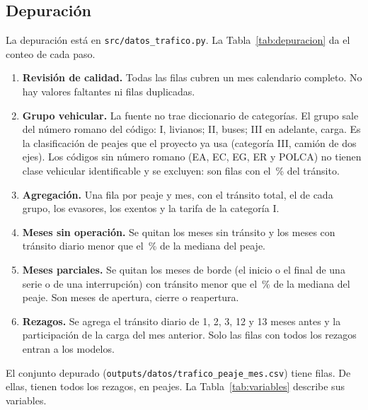\documentclass[12pt,a4paper]{article}
\begin{document}
\subsection{Depuración}

La depuración está en \texttt{src/datos\_trafico.py}. La
Tabla~\ref{tab:depuracion} da el conteo de cada paso.

\begin{enumerate}
\item \textbf{Revisión de calidad.} Todas las filas cubren un mes calendario
completo. No hay valores faltantes ni filas duplicadas.
\item \textbf{Grupo vehicular.} La fuente no trae diccionario de categorías.
El grupo sale del número romano del código: I, livianos; II, buses; III en
adelante, carga. Es la clasificación de peajes que el proyecto ya usa
(categoría III, camión de dos ejes). Los códigos sin número romano (EA, EC,
EG, ER y POLCA) no tienen clase vehicular identificable y se excluyen: son
\ctFilasSinClase{} filas con el \ctTransitoSinClase\,\% del tránsito.
\item \textbf{Agregación.} Una fila por peaje y mes, con el tránsito total,
el de cada grupo, los evasores, los exentos y la tarifa de la categoría I.
\item \textbf{Meses sin operación.} Se quitan los meses sin tránsito y los
meses con tránsito diario menor que el \ctUmbralAnomalo\,\% de la mediana del
peaje.
\item \textbf{Meses parciales.} Se quitan los meses de borde (el inicio o el
final de una serie o de una interrupción) con tránsito menor que el
\ctUmbralParcial\,\% de la mediana del peaje. Son meses de apertura, cierre o
reapertura.
\item \textbf{Rezagos.} Se agrega el tránsito diario de 1, 2, 3, 12 y 13
meses antes y la participación de la carga del mes anterior. Solo las filas
con todos los rezagos entran a los modelos.
\end{enumerate}

\begin{table}[H]
\centering
\caption{Filas en cada paso de la depuración}
\label{tab:depuracion}
\small

\end{table}

El conjunto depurado (\nolinkurl{outputs/datos/trafico_peaje_mes.csv}) tiene
\ctFilasDepuradas{} filas. De ellas, \ctFilasModelables{} tienen todos los
rezagos, en \ctPeajesModelables{} peajes. La Tabla~\ref{tab:variables}
describe sus variables.
\end{document}
